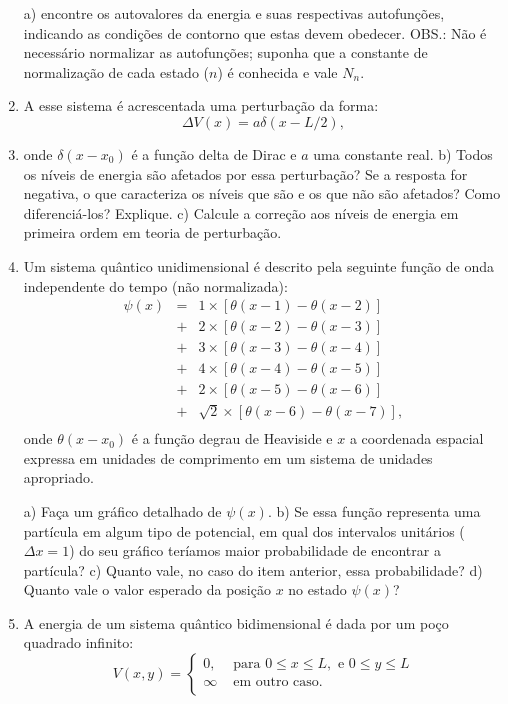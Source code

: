 \begin{enumerate}[start=1,label={\bfseries Q\arabic*.}]
a) encontre os autovalores da energia e suas respectivas autofunções, indicando as condições de contorno que estas devem obedecer. OBS.: Não é necessário normalizar as autofunções; suponha que a constante de normalização de cada estado ($n$) é conhecida e vale $N_{n}$.
\item[  ] A esse sistema é acrescentada uma perturbação da forma:
$$
\Delta V(x) = a \delta (x - L/2),
$$
\item[  ] onde $\delta (x - x_{0})$ é a função delta de Dirac e $a$ uma constante real.
b) Todos os níveis de energia são afetados por essa perturbação? Se a resposta for negativa, o que caracteriza os níveis que são e os que não são afetados? Como diferenciá-los? Explique.
c) Calcule a correção aos níveis de energia em primeira ordem em teoria de perturbação.





\item Um sistema quântico unidimensional é descrito pela seguinte função de onda independente do tempo (não normalizada):
$$
\begin{array}{ccc}
    \psi (x) & = & 1 \times [ \theta (x - 1) - \theta (x - 2) ]  \\
             & + & 2 \times [ \theta (x - 2) - \theta (x - 3) ]  \\
             & + & 3 \times [ \theta (x - 3) - \theta (x - 4) ]  \\
             & + & 4 \times [ \theta (x - 4) - \theta (x - 5) ]  \\
             & + & 2 \times [ \theta (x - 5) - \theta (x - 6) ]  \\
             & + & \sqrt{2} \times [ \theta (x - 6) - \theta (x - 7) ], \\
\end{array}
$$
onde $\theta(x - x_{0})$ é a função degrau de Heaviside e $x$ a coordenada espacial expressa em unidades de comprimento em um sistema de unidades apropriado.

  a) Faça um gráfico detalhado de $\psi(x)$.
  b) Se essa função representa uma partícula em algum tipo de potencial, em qual dos intervalos unitários ($\Delta x = 1$) do seu gráfico teríamos maior probabilidade de encontrar a partícula?
  c) Quanto vale, no caso do item anterior, essa probabilidade?
  d) Quanto vale o valor esperado da posição $x$ no estado $\psi(x)$?




\item A energia de um sistema quântico bidimensional é dada por um poço quadrado infinito:
$$
V(x,y) = \left\{
  \begin{array}{cc}
    0, & \mbox{ para } 0 \leq x \leq L, \mbox{ e } 0 \leq y \leq L \\
    \infty & \mbox{ em outro caso. } \\
  \end{array}
\right.
$$


\end{enumerate}
